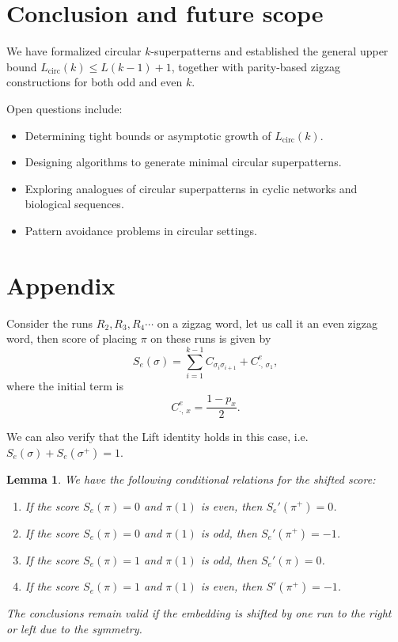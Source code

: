 \documentclass[a4paper,12pt]{article}
\newtheorem{lemma}[theorem]{Lemma}
\theoremstyle{definition}
\numberwithin{equation}{section}
\begin{document}
\section{Conclusion and future scope}
We have formalized circular $k$-superpatterns and established the general upper bound $L_{\mathrm{circ}}(k)\le L(k-1)+1$, together with parity-based zigzag constructions for both odd and even $k$.  

Open questions include: 
\begin{itemize}
\item Determining tight bounds or asymptotic growth of $L_{\mathrm{circ}}(k)$. 

\item Designing algorithms to generate minimal circular superpatterns. 

\item Exploring analogues of circular superpatterns in cyclic networks and biological sequences. 

\item Pattern avoidance problems in circular settings.

\end{itemize}

\section{Appendix}\label{appendix}
Consider the runs $R_2,R_3,R_4 \cdots $ on a zigzag word, let us call it an even zigzag word, then score of placing $\pi$ on these runs is given by
\begin{equation}\label{ssigma}
S_e(\sigma) = \sum_{i=1}^{k-1} C_{\sigma_i \sigma_{i+1}}
         + C^e_{\cdot,\,\sigma_1},    
\end{equation}
where the initial term is
\[
C^e_{\cdot,\,x} = \frac{1 - p_x}{2}.
\]

We can also verify that the Lift identity holds in this case, i.e. $S_e(\sigma) + S_e(\sigma^+) = 1$.
\begin{lemma} We have the following conditional relations for the shifted score:
\begin{enumerate}
    \item If the score $S_e(\pi) = 0$ and $\pi(1)$ is even, then $S_e'(\pi^+) = 0$. 
 
    \item  If the score $S_e(\pi) = 0$ and $\pi(1)$ is odd, then $S_e'(\pi^+)  = -1$.  
    
    \item If the score $S_e(\pi) = 1$ and $\pi(1)$ is odd, then $S_e'(\pi) = 0$.  

    \item  If the score $S_e(\pi) = 1$ and $\pi(1)$ is even, then  $S'(\pi^+)  = -1$.  
\end{enumerate}
The conclusions remain valid if the embedding is shifted by one run to the right or left due to the symmetry.
\end{lemma}\label{even_shifted_score}
\end{document}
